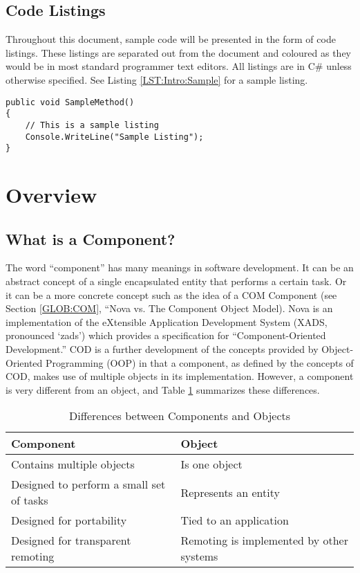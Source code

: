 \documentclass[a4paper,12pt]{article}
\newenvironment{tblcont}[2]{\begin{center}\begin{tabular}{#1}\hline #2\\
	\hline}{\hline\end{tabular}\end{center}}
\begin{document}
\subsection{Code Listings}
\label{SEC:Intro:Listings}
Throughout this document, sample code will be presented in the form of code listings. These listings are separated out from the document and coloured as they would be in most standard programmer text editors. All listings are in C\# unless otherwise specified. See Listing \ref{LST:Intro:Sample} for a sample listing.

\begin{lstlisting}[float,caption={A Sample Listing},label={LST:Intro:Sample}]
public void SampleMethod()
{
	// This is a sample listing
	Console.WriteLine("Sample Listing");
}
\end{lstlisting}

\section{Overview}
\label{SEC:OVR}

\subsection{What is a Component?}
\label{SEC:OVR:Comp}
The word ``component'' has many meanings in software development. It can be an abstract concept of a single encapsulated entity that performs a certain task. Or it can be a more concrete concept such as the idea of a COM Component (see Section \ref{GLOB:COM}, ``Nova vs. The Component Object Model). Nova is an implementation of the eXtensible Application Development System (XADS, pronounced `zads') which provides a specification for ``Component-Oriented Development.'' COD is a further development of the concepts provided by Object-Oriented Programming (OOP) in that a component, as defined by the concepts of COD, makes use of multiple objects in its implementation. However, a component is very different from an object, and Table \ref{TAB:CvO} summarizes these differences.

\begin{table}
\begin{tblcont}{| l | l |}{\textbf{Component} & \textbf{Object}}
Contains multiple objects & Is one object\\
\hline
Designed to perform a small set of tasks & Represents an entity\\
\hline
Designed for portability & Tied to an application\\
\hline
Designed for transparent remoting & Remoting is implemented by other systems\\
\end{tblcont}
\caption{\label{TAB:CvO} Differences between Components and Objects}
\end{table}
\end{document}
